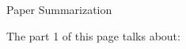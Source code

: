 \documentclass[UTF8,a4paper,10pt]{article}
\begin{document}





\pagebreak

  \begin{Problem}[]{}
  Paper Summarization
    
  \end{Problem}

  The part 1 of this page talks about:
\end{document}
